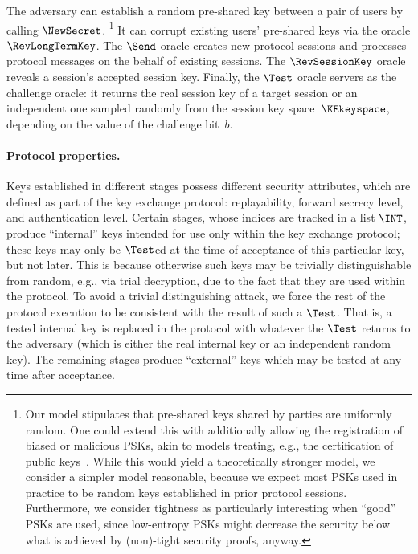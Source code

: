 The adversary can establish a random pre-shared key between a pair of users by calling $\NewSecret$.%
\footnote{%
Our model stipulates that pre-shared keys shared by parties are uniformly random.
One could extend this with additionally allowing the registration of biased or malicious PSKs, akin to models treating, e.g., the certification of public keys~\cite{ESORICS:BCFPPS13}. While this would yield a theoretically stronger model, we consider a simpler model reasonable, because we expect most PSKs used in practice to be random keys established in prior protocol sessions. Furthermore, we consider tightness as particularly interesting when ``good'' PSKs are used, since low-entropy PSKs might decrease the security below what is achieved by (non)-tight security proofs, anyway.
}
It can corrupt existing users' pre-shared keys via the oracle $\RevLongTermKey$.
The $\Send$ oracle creates new protocol sessions and processes protocol messages on the behalf of existing sessions.
The $\RevSessionKey$ oracle reveals a session's accepted session key.
Finally, the $\Test$ oracle servers as the challenge oracle:
it returns the real session key of a target session or an independent one sampled randomly from the session key space~$\KEkeyspace$, depending on the value of the challenge bit~$b$.
\iffull
{}
\fi

\paragraph{Protocol properties.}
Keys established in different stages possess different security attributes, which are defined as part of the key exchange protocol: replayability, forward secrecy level, and authentication level. 
Certain stages, whose indices are tracked in a list $\INT$, produce ``internal'' keys intended for use only within the key exchange protocol; these keys may only be $\Test$ed at the time of acceptance of this particular key, but not later.
This is because otherwise such keys may be trivially distinguishable from random, e.g., via trial decryption, due to the fact that they are used within the protocol.
To avoid a trivial distinguishing attack, we force the rest of the protocol execution to be consistent with the result of such a $\Test$.
That is, a tested internal key is replaced in the protocol with whatever the $\Test$ returns to the adversary (which is either the real internal key or an independent random key).
\iffull
{}
\fi
The remaining stages produce ``external'' keys which may be tested at any time after acceptance. 

